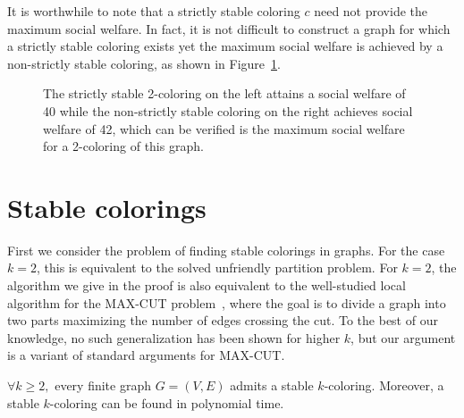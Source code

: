 \documentclass{llncs}
\begin{document}
It is worthwhile to note that a strictly stable coloring $c$ need not provide
the maximum social welfare.  In fact, it is not difficult to construct a graph
for which a strictly stable coloring exists yet the maximum social welfare is
achieved by a non-strictly stable coloring, as shown in
Figure~\ref{fig:weakstrongwelfare}. 
\begin{figure}[htb]
\centering
{}
\caption{The strictly stable 2-coloring on the left attains a social welfare of
40 while the non-strictly stable coloring on the right achieves social welfare
of 42, which can be verified is the maximum social welfare for a 2-coloring of
this graph.}
\label{fig:weakstrongwelfare}
\end{figure}

\section{Stable colorings}

First we consider the problem of finding stable colorings in graphs.
For the case $k=2$, this is equivalent to the solved unfriendly partition
problem.  For $k=2$, the algorithm we give in the proof is also 
equivalent to the well-studied local %
algorithm for the MAX-CUT problem~\cite{ElsasserT11,MonienT10}, 
where the goal is to divide a graph
into two parts maximizing the number of edges crossing the cut.
To the best of our knowledge, no such generalization has been shown for higher $k$,
but our argument is a variant of standard arguments for MAX-CUT.

\begin{theorem}
$\forall k \ge 2,$ every finite graph $G=(V,E)$ admits a stable $k$-coloring.
Moreover, a stable $k$-coloring can be found in polynomial time.
\end{theorem}
\end{document}

